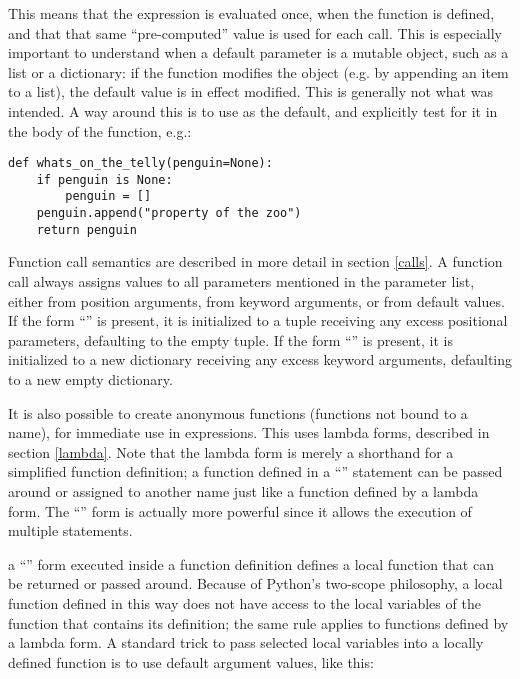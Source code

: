   This means that the expression is evaluated
once, when the function is defined, and that that same
``pre-computed'' value is used for each call.  This is especially
important to understand when a default parameter is a mutable object,
such as a list or a dictionary: if the function modifies the object
(e.g. by appending an item to a list), the default value is in effect
modified.  This is generally not what was intended.  A way around this 
is to use  as the default, and explicitly test for it in
the body of the function, e.g.:

\begin{verbatim}
def whats_on_the_telly(penguin=None):
    if penguin is None:
        penguin = []
    penguin.append("property of the zoo")
    return penguin
\end{verbatim}

Function call semantics are described in more detail in section
\ref{calls}. 
A function call always assigns values to all parameters mentioned in
the parameter list, either from position arguments, from keyword
arguments, or from default values.  If the form ``''
is present, it is initialized to a tuple receiving any excess
positional parameters, defaulting to the empty tuple.  If the form
``'' is present, it is initialized to a new
dictionary receiving any excess keyword arguments, defaulting to a
new empty dictionary.





It is also possible to create anonymous functions (functions not bound
to a name), for immediate use in expressions.  This uses lambda forms,
described in section \ref{lambda}.  Note that the lambda form is
merely a shorthand for a simplified function definition; a function
defined in a ``'' statement can be passed around or
assigned to another name just like a function defined by a lambda
form.  The ``'' form is actually more powerful since it
allows the execution of multiple statements.

 a ``'' form executed inside a
function definition defines a local function that can be returned or
passed around.  Because of Python's two-scope philosophy, a local
function defined in this way does not have access to the local
variables of the function that contains its definition; the same rule
applies to functions defined by a lambda form.  A standard trick to
pass selected local variables into a locally defined function is to
use default argument values, like this:

